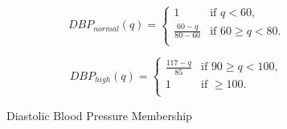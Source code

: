 \begin{figure}[!htb]
    \caption{Diastolic Blood Pressure Membership}
    \[
        \textit{DBP}_{normal}(q) = \left\{%
        \begin{array}{ll}
            1                  & \textrm{if }q<60,       \\
            \frac{60-q}{80-60} & \textrm{if }60\ge q<80. \\
        \end{array}%
        \right.
    \]

    \[
        \textit{DBP}_{high}(q) = \left\{%
        \begin{array}{ll}
            \frac{117-q}{85} & \textrm{if }90\ge q<100, \\
            1                & \textrm{if }\ge 100.     \\
        \end{array}%
        \right.
    \]
    \label{fig:diastolic}
\end{figure}
